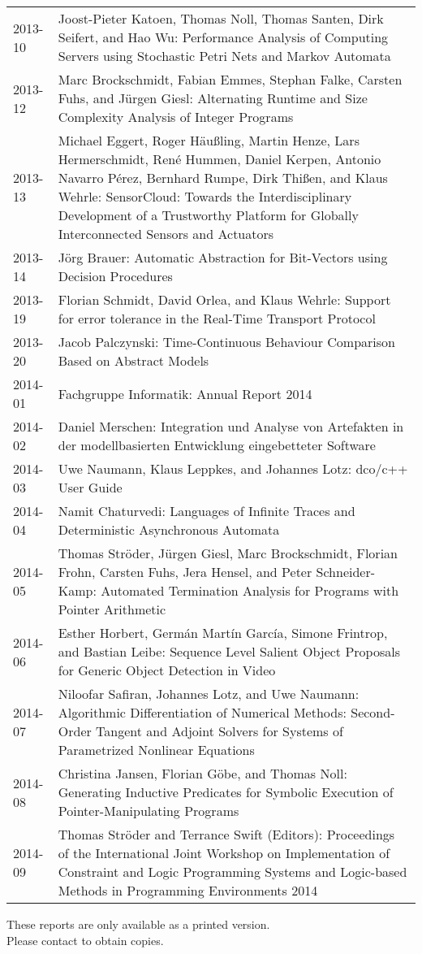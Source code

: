 \documentclass[color]{aib}
\begin{document}
\begin{longtable}{lp{11cm}}
2013-10 & Joost-Pieter Katoen, Thomas Noll, Thomas Santen, Dirk Seifert, and Hao Wu:         Performance Analysis of Computing Servers using Stochastic Petri Nets and Markov Automata\\
2013-12 & Marc Brockschmidt, Fabian Emmes, Stephan Falke, Carsten Fuhs, and J\"{u}rgen Giesl:         Alternating Runtime and Size Complexity Analysis of Integer Programs\\
2013-13 & Michael Eggert, Roger H\"{a}u\ss{}ling, Martin Henze, Lars Hermerschmidt, Ren\'{e} Hummen, Daniel Kerpen, Antonio Navarro P\'{e}rez, Bernhard Rumpe, Dirk Thi\ss{}en, and Klaus Wehrle:         SensorCloud: Towards the Interdisciplinary Development of a Trustworthy Platform for Globally Interconnected Sensors and Actuators\\
2013-14 & J\"{o}rg Brauer:         Automatic Abstraction for Bit-Vectors using Decision Procedures\\
2013-19 & Florian Schmidt, David Orlea, and Klaus Wehrle:         Support for error tolerance in the Real-Time Transport Protocol\\
2013-20 & Jacob Palczynski:         Time-Continuous Behaviour Comparison Based on Abstract Models\\
2014-01  &Fachgruppe Informatik:      Annual Report 2014\\
2014-02 & Daniel Merschen:         Integration und Analyse von Artefakten in der modellbasierten Entwicklung eingebetteter Software\\
2014-03 & Uwe Naumann, Klaus Leppkes, and Johannes Lotz:         dco/c++ User Guide\\
2014-04 & Namit Chaturvedi:         Languages of Infinite Traces and Deterministic Asynchronous Automata\\
2014-05 & Thomas Str\"{o}der, J\"{u}rgen Giesl, Marc Brockschmidt, Florian Frohn, Carsten Fuhs, Jera Hensel, and Peter Schneider-Kamp:         Automated Termination Analysis for Programs with Pointer Arithmetic\\
2014-06 & Esther Horbert, Germ\'{a}n Mart\'{i}n Garc\'{i}a, Simone Frintrop, and Bastian Leibe:         Sequence Level Salient Object Proposals for Generic Object Detection in Video\\
2014-07 & Niloofar Safiran, Johannes Lotz, and Uwe Naumann:         Algorithmic Differentiation of Numerical Methods: Second-Order Tangent and Adjoint Solvers for Systems of Parametrized Nonlinear Equations\\
2014-08 & Christina Jansen, Florian G\"{o}be, and Thomas Noll:         Generating Inductive Predicates for Symbolic Execution of Pointer-Manipulating Programs\\
2014-09 & Thomas Str\"{o}der and Terrance Swift (Editors):         Proceedings of the International Joint Workshop on Implementation of Constraint and Logic Programming Systems and Logic-based Methods in Programming Environments 2014\\

\end{longtable}
\bigskip

\noindent
{\small  These reports are only available as a printed version.\\
  Please contact  to obtain
  copies.}
 
\end{document}
